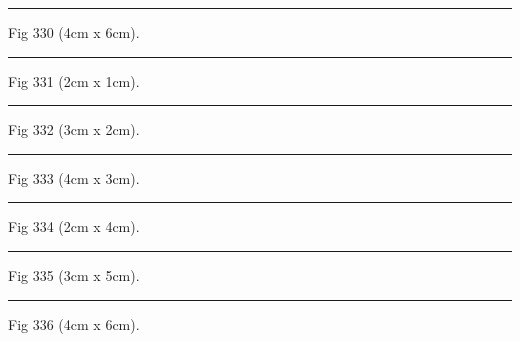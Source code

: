 \documentclass[a4paper,11pt]{article}
\begin{document}
\begin{swarmwrap}%
  \begin{minipage}[t]{4cm}
    \centering
    \rule{\linewidth}{6cm}
    {\footnotesize Fig 330 (4cm x 6cm).}
  \end{minipage}%
\end{swarmwrap}%
\swarmwrapnext
\lipsum[30]%

\begin{swarmwrap}%
  \begin{minipage}[t]{2cm}
    \centering
    \rule{\linewidth}{1cm}
    {\footnotesize Fig 331 (2cm x 1cm).}
  \end{minipage}%
\end{swarmwrap}%
\swarmwrapnext
\lipsum[31]%

\begin{swarmwrap}%
  \begin{minipage}[t]{3cm}
    \centering
    \rule{\linewidth}{2cm}
    {\footnotesize Fig 332 (3cm x 2cm).}
  \end{minipage}%
\end{swarmwrap}%
\swarmwrapnext
\lipsum[32]%

\begin{swarmwrap}%
  \begin{minipage}[t]{4cm}
    \centering
    \rule{\linewidth}{3cm}
    {\footnotesize Fig 333 (4cm x 3cm).}
  \end{minipage}%
\end{swarmwrap}%
\swarmwrapnext
\lipsum[33]%

\begin{swarmwrap}%
  \begin{minipage}[t]{2cm}
    \centering
    \rule{\linewidth}{4cm}
    {\footnotesize Fig 334 (2cm x 4cm).}
  \end{minipage}%
\end{swarmwrap}%
\swarmwrapnext
\lipsum[34]%

\begin{swarmwrap}%
  \begin{minipage}[t]{3cm}
    \centering
    \rule{\linewidth}{5cm}
    {\footnotesize Fig 335 (3cm x 5cm).}
  \end{minipage}%
\end{swarmwrap}%
\swarmwrapnext
\lipsum[35]%

\begin{swarmwrap}%
  \begin{minipage}[t]{4cm}
    \centering
    \rule{\linewidth}{6cm}
    {\footnotesize Fig 336 (4cm x 6cm).}
  \end{minipage}%
\end{swarmwrap}%
\swarmwrapnext
\lipsum[36]%
\end{document}
